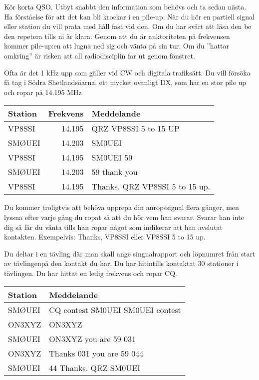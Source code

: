 Kör korta QSO. Utbyt snabbt den information som behövs och ta sedan nästa. Ha
förståelse för att det kan bli krockar i en pile-up. När du hör en partiell
signal eller station du vill prata med håll fast vid den. Om du har svårt att
läsa den be den repetera tills ni är klara. Genom att du är auktoriteten på
frekvensen kommer pile-up:en att lugna ned sig och vänta på sin tur. Om du
''hattar omkring'' är risken att all radiodisciplin far ut genom fönstret.

Ofta är det 1 kHz upp som gäller vid CW och digitala trafiksätt.  Du vill
försöka få tag i Södra Shetlandsöarna, ett mycket ovanligt DX, som har en stor
pile up och ropar på 14.195 MHz

\begin{tabular}{lrl}
	Station & Frekvens & Meddelande                     \\ \hline
	VP8SSI  &   14.195 & QRZ VP8SSI  5 to 15 UP         \\
	SMØUEI  &   14.203 & SM0UEI                         \\
	VP8SSI  &   14.195 & SM0UEI 59                      \\
	SMØUEI  &   14.203 & 59 thank you                   \\
	VP8SSI  &   14.195 & Thanks. QRZ VP8SSI 5 to 15 up.
\end{tabular}

Du kommer troligtvis att behöva upprepa din anropssignal flera gånger, men
lyssna efter varje gång du ropat så att du hör vem han svarar. Svarar han inte
dig så får du vänta tills han ropar något som indikerar att han avslutat
kontakten. Exempelvis: Thanks, VP8SSI eller VP8SSI 5 to 15 up.

Du deltar i en tävling där man skall ange singnalrapport och löpnumret från
start av tävlingenpå den kontakt du har. Du har hitintills kontaktat 30
stationer i tävlingen. Du har hittat en ledig frekvens och ropar CQ.

\begin{tabular}{ll}
	Station & Meddelande                       \\ \hline
	SMØUEI  & CQ contest SM0UEI SM0UEI contest \\
	ON3XYZ  & ON3XYZ                           \\
	SMØUEI  & ON3XYZ you are 59 031            \\
	ON3XYZ  & Thanks 031 you are 59 044        \\
	SMØUEI  & 44 Thanks. QRZ SM0UEI
\end{tabular}

